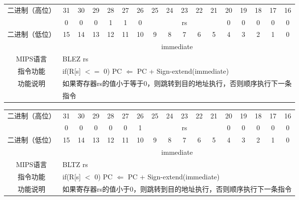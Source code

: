 \begin{table}
\begin{tabular}{|c|c|c|c|c|c|c|c|c|c|c|c|c|c|c|c|c|}
\hline
\multirow{2}{*}{二进制（高位）} &
31&30&29&28&27&26&25&24&23&22&21&20&19&18&17&16\\
\cline{2-17}
&
0&0&0&1&1&
0&
\multicolumn{5}{c|}{rs}&
0&0&0&0&0\\
\hline
\multirow{2}{*}{二进制（低位）} &
15&14&13&12&11&10&9&8&7&6&5&4&3&2&1&0\\
\cline{2-17}
&
\multicolumn{16}{c|}{immediate}\\
\hline
MIPS语言&
\multicolumn{16}{l|}{BLEZ rs}\\
\hline
指令功能&
\multicolumn{16}{l|}{if(R[s] $<=$ 0) PC $\Leftarrow$ PC + Sign-extend(immediate)}\\
\hline
\multirow{2}{*}{功能说明}&
\multicolumn{16}{l|}{如果寄存器rs的值小于等于0，则跳转到目的地址执行，否则顺序执行下一条}\\
&\multicolumn{16}{l|}{指令}\\
\hline
\end{tabular}
\end{table}

\begin{table}
\begin{tabular}{|c|c|c|c|c|c|c|c|c|c|c|c|c|c|c|c|c|}
\hline
\multirow{2}{*}{二进制（高位）} &
31&30&29&28&27&26&25&24&23&22&21&20&19&18&17&16\\
\cline{2-17}
&
0&0&0&0&0&
1&
\multicolumn{5}{c|}{rs}&
0&0&0&0&0\\
\hline
\multirow{2}{*}{二进制（低位）} &
15&14&13&12&11&10&9&8&7&6&5&4&3&2&1&0\\
\cline{2-17}
&
\multicolumn{16}{c|}{immediate}\\
\hline
MIPS语言&
\multicolumn{16}{l|}{BLTZ rs}\\
\hline
指令功能&
\multicolumn{16}{l|}{if(R[s] $<$ 0) PC $\Leftarrow$ PC + Sign-extend(immediate)}\\
\hline
功能说明&
\multicolumn{16}{l|}{如果寄存器rs的值小于0，则跳转到目的地址执行，否则顺序执行下一条指令}\\
\hline
\end{tabular}
\end{table}

